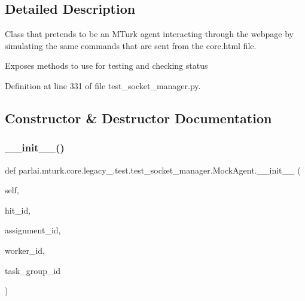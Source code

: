 \subsection{Detailed Description}
\begin{DoxyVerb}Class that pretends to be an MTurk agent interacting through the webpage by
simulating the same commands that are sent from the core.html file.

Exposes methods to use for testing and checking status
\end{DoxyVerb}
 

Definition at line 331 of file test\+\_\+socket\+\_\+manager.\+py.



\subsection{Constructor \& Destructor Documentation}
\mbox{\label{classparlai_1_1mturk_1_1core_1_1legacy__2018_1_1test_1_1test__socket__manager_1_1MockAgent_a746f067b826dce10f774460bc1743cef}} 
\subsubsection{\texorpdfstring{\+\_\+\+\_\+init\+\_\+\+\_\+()}{\_\_init\_\_()}}
{\footnotesize\ttfamily def parlai.\+mturk.\+core.\+legacy\+\_.\+test.\+test\+\_\+socket\+\_\+manager.\+Mock\+Agent.\+\_\+\+\_\+init\+\_\+\+\_\+ (\begin{DoxyParamCaption}\item[{}]{self,  }\item[{}]{hit\+\_\+id,  }\item[{}]{assignment\+\_\+id,  }\item[{}]{worker\+\_\+id,  }\item[{}]{task\+\_\+group\+\_\+id }\end{DoxyParamCaption})}



